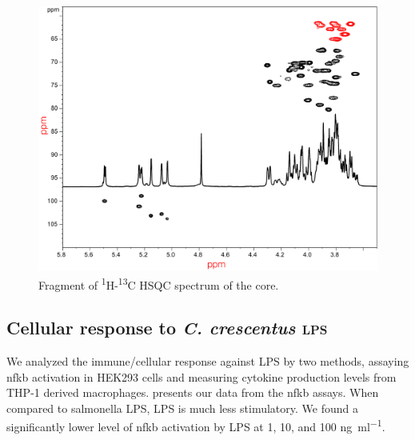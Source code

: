 \begin{figure}[htb]
  \begin{center}
    \includegraphics[width=\textwidth]{lps_chapter/img/lpsfig4.pdf}
  \end{center}
  \caption{Fragment of \textsuperscript{1}H-\textsuperscript{13}C \ac{HSQC} spectrum of the core.}
  \label{fig:lpscorenmr}	
\end{figure}

\subsection{Cellular response to \textit{C. crescentus} \textsc{lps}}\label{sec:cell-resp-text}
We analyzed the immune/cellular response against \caulobacter{} \ac{LPS} by two methods, assaying \ac{nfkb} activation in HEK293 cells and measuring cytokine production levels from THP-1 derived macrophages.  presents our data from the \ac{nfkb} assays. When compared to \ac{salmonella} \ac{LPS}, \caulobacter{} \ac{LPS} is much less stimulatory. We found a significantly lower level of \ac{nfkb} activation by \caulobacter{} \ac{LPS} at 1, 10, and 100 \si{\nano\gram\per\milli\litre}.

